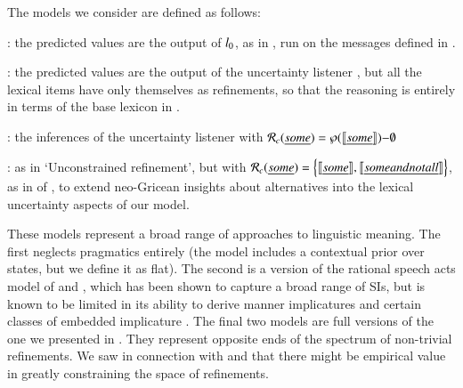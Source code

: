 \documentclass[leqno,12pt]{article}
\begin{document}
The models we consider are defined as follows:
%
\begin{examples}
\item 
  \begin{examples}
  \item {}: the predicted values are the output
    of $l_{0}$, as in , run on the messages
    defined in .
  \item {}: the predicted values are the
    output of the uncertainty listener , but all the
    lexical items have only themselves as refinements, so that the
    reasoning is entirely in terms of the base lexicon in
    .
  \item {}: the inferences of the
    uncertainty listener  with $\mathcal{R}_{c}(\emph{some})
    = \wp(\llbracket\emph{some}\rrbracket){-}\emptyset$
  \item {}: as in `Unconstrained
    refinement', but with
    $\mathcal{R}_{c}(\emph{some}) = \left\{ \llbracket\emph{some}\rrbracket, \llbracket\emph{some
          and not all}\rrbracket \right\}$,
    as in  of , 
    to extend neo-Gricean insights about alternatives into
    the lexical uncertainty aspects of our model.
  \end{examples}
\end{examples}

These models represent a broad range of approaches to linguistic
meaning. The first neglects pragmatics entirely (the model includes a
contextual prior over states, but we define it as flat). The second is
a version of the rational speech acts model of
\citet{Frank:Goodman:2012} and \citet{Goodman:Stuhlmuller:2013}, which
has been shown to capture a broad range of SIs, but is known to be
limited in its ability to derive manner implicatures and certain
classes of embedded implicature
\citep{Bergen:Goodman:Levy:2012,Bergen:Levy:Goodman:2014}. The final
two models are full versions of the one we presented in
. They represent opposite ends of the spectrum of
non-trivial refinements. We saw in connection with
 and  that there
might be empirical value in greatly constraining the space of
refinements.  
\end{document}
